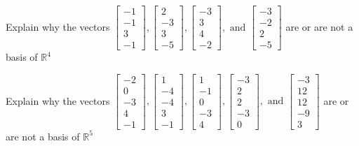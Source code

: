 \documentclass{article}
\begin{document}
\begin{exerciseStatement}
    Explain why the vectors \(\left[\begin{array}{r}
-1 \\
-1 \\
3 \\
-1
\end{array}\right] , \left[\begin{array}{r}
2 \\
-3 \\
3 \\
-5
\end{array}\right] , \left[\begin{array}{r}
-3 \\
3 \\
4 \\
-2
\end{array}\right] , \text{ and } \left[\begin{array}{r}
-3 \\
-2 \\
2 \\
-5
\end{array}\right]\) are or are not a basis of \(\mathbb{R}^4\)


  
\end{exerciseStatement}

\begin{exerciseStatement}
    Explain why the vectors \(\left[\begin{array}{r}
-2 \\
0 \\
-3 \\
4 \\
-1
\end{array}\right] , \left[\begin{array}{r}
1 \\
-4 \\
-4 \\
3 \\
-1
\end{array}\right] , \left[\begin{array}{r}
1 \\
-1 \\
0 \\
-3 \\
4
\end{array}\right] , \left[\begin{array}{r}
-3 \\
2 \\
2 \\
-3 \\
0
\end{array}\right] , \text{ and } \left[\begin{array}{r}
-3 \\
12 \\
12 \\
-9 \\
3
\end{array}\right]\) are or are not a basis of \(\mathbb{R}^5\)


  
\end{exerciseStatement}
\end{document}
